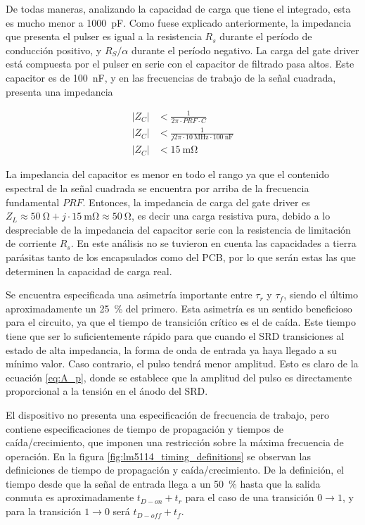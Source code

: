 De todas maneras, analizando la capacidad de carga que tiene el integrado, esta
es mucho menor a \qty{1000}{\pico\farad}. Como fuese explicado anteriormente, la
impedancia que presenta el pulser es igual a la resistencia $R_s$ durante el
período de conducción positivo, y $R_S/\alpha$ durante el período negativo. La
carga del gate driver está compuesta por el pulser en serie con el capacitor de
filtrado pasa altos. Este capacitor es de \qty{100}{\nano\farad}, y en las
frecuencias de trabajo de la señal cuadrada, presenta una impedancia

\begin{equation}
    \begin{aligned}
        | Z_C | &< \frac{1}{2\pi \cdot PRF \cdot C} \\
        | Z_C | &< \frac{1}{j2\pi \cdot \qty{10}{\mega\hertz} \cdot
        \qty{100}{\nano\farad}} \\
        | Z_C | &< \qty{15}{\milli\ohm}
    \end{aligned}
\end{equation}

La impedancia del capacitor es menor en todo el rango ya que el contenido
espectral de la señal cuadrada se encuentra por arriba de la frecuencia
fundamental $PRF$. Entonces, la impedancia de carga del gate driver es $Z_L
\approx \qty{50}{\ohm} + j \cdot \qty{15}{\milli\ohm} \approx \qty{50}{\ohm}$,
es decir una carga resistiva pura, debido a lo despreciable de la impedancia del
capacitor serie con la resistencia de limitación de corriente $R_s$. En este
análisis no se tuvieron en cuenta las capacidades a tierra parásitas tanto de
los encapsulados como del PCB, por lo que serán estas las que determinen la
capacidad de carga real.

Se encuentra especificada una asimetría importante entre $\tau_r$ y $\tau_f$,
siendo el último aproximadamente un \qty{25}{\percent} del primero. Esta
asimetría es un sentido beneficioso para el circuito, ya que el tiempo de
transición crítico es el de caída. Este tiempo tiene que ser lo suficientemente
rápido para que cuando el SRD transiciones al estado de alta impedancia, la forma
de onda de entrada ya haya llegado a su mínimo valor. Caso contrario, el pulso
tendrá menor amplitud. Esto es claro de la ecuación \ref{eq:A_p}, donde se
establece que la amplitud del pulso es directamente proporcional a la tensión en
el ánodo del SRD.

El dispositivo no presenta una especificación de frecuencia de trabajo, pero
contiene especificaciones de tiempo de propagación y tiempos de
caída/crecimiento, que imponen una restricción sobre la máxima frecuencia de
operación. En la figura \ref{fig:lm5114_timing_definitions} se observan las
definiciones de tiempo de propagación y caída/crecimiento. De la definición, el
tiempo desde que la señal de entrada llega a un \qty{50}{\percent} hasta que la
salida conmuta es aproximadamente $t_{D-on}+t_{r}$ para el caso de una
transición $0\to1$, y para la transición $1\to0$ será $t_{D-off}+t_{f}$.

